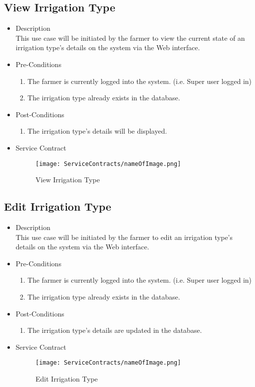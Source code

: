 \documentclass[11pt,fleqn]{book} %
\begin{document}
\subsection{View Irrigation Type}
\begin{itemize}
	\item Description\\
	This use case will be initiated by the farmer to view the current state of an irrigation type’s details on the system via the Web interface.
	\item Pre-Conditions
	\begin{enumerate}
		\item The farmer is currently logged into the system. (i.e. Super user logged in)
		\item The irrigation type already exists in the database.				
	\end{enumerate}
	\item Post-Conditions
	\begin{enumerate}
		\item The irrigation type’s details will be displayed.
	\end{enumerate}
	\item Service Contract
	\begin{figure}
		\texttt{[image: ServiceContracts/nameOfImage.png]}
		\caption{View Irrigation Type}
	\end{figure}
\end{itemize}

\subsection{Edit Irrigation Type}
\begin{itemize}
	\item Description\\
	This use case will be initiated by the farmer to edit an irrigation type’s details on the system via the Web interface.
	\item Pre-Conditions
	\begin{enumerate}
		\item The farmer is currently logged into the system. (i.e. Super user logged in)
		\item The irrigation type already exists in the database.					
	\end{enumerate}
	\item Post-Conditions
	\begin{enumerate}
		\item The irrigation type’s details are updated in the database.
	\end{enumerate}
	\item Service Contract
	\begin{figure}
		\texttt{[image: ServiceContracts/nameOfImage.png]}
		\caption{Edit Irrigation Type}
	\end{figure}
\end{itemize}
\end{document}
